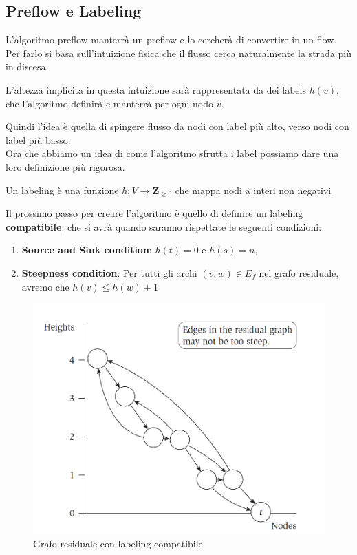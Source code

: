 \subsection{Preflow e Labeling}
L'algoritmo preflow manterrà un preflow e lo cercherà di convertire in un flow.
Per farlo si basa sull'intuizione fisica che il flusso cerca naturalmente la
strada più in discesa.

L'altezza implicita in questa intuizione sarà rappresentata da dei labels
$h(v)$, che l'algoritmo definirà e manterrà per ogni nodo $v$.

Quindi l'idea è quella di spingere flusso da nodi con label più alto, verso nodi
con label più basso.\\

Ora che abbiamo un idea di come l'algoritmo sfrutta i label possiamo dare una
loro definizione più rigorosa.

\begin{myblockquote}
      Un labeling è una funzione $h: V \rightarrow \mathbf{Z}_{\ge 0}$ che mappa
      nodi a interi non negativi
\end{myblockquote}

Il prossimo passo per creare l'algoritmo è quello di definire un labeling
\textbf{compatibile}, che si avrà quando saranno rispettate le seguenti
condizioni:
\begin{enumerate}
      \item \textbf{Source and Sink condition}: $h(t) = 0$ e $h(s) = n$,
      \item \textbf{Steepness condition}: Per tutti gli archi $(v,w) \in E_f$ nel
            grafo residuale, avremo che $h(v) \le h(w) + 1$
\end{enumerate}

\begin{figure}[H]
      \centering
      \includegraphics[width = 10 cm]{capitoli/network_flow/imgs/preflow1.png}
      \caption{Grafo residuale con labeling compatibile}
\end{figure}

